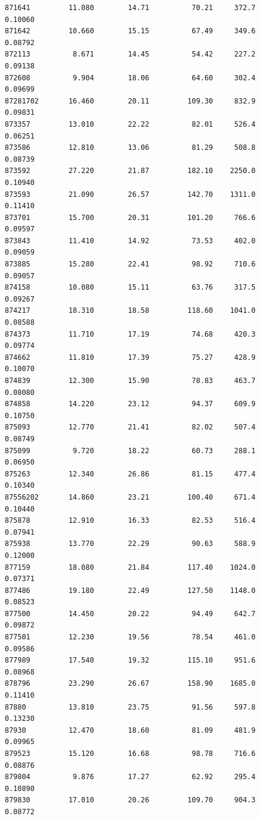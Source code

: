 \documentclass[
  letterpaper,
  DIV=11,
  numbers=noendperiod]{scrartcl}
\begin{document}
\begin{verbatim}
871641         11.080        14.71          70.21     372.7         0.10060
871642         10.660        15.15          67.49     349.6         0.08792
872113          8.671        14.45          54.42     227.2         0.09138
872608          9.904        18.06          64.60     302.4         0.09699
87281702       16.460        20.11         109.30     832.9         0.09831
873357         13.010        22.22          82.01     526.4         0.06251
873586         12.810        13.06          81.29     508.8         0.08739
873592         27.220        21.87         182.10    2250.0         0.10940
873593         21.090        26.57         142.70    1311.0         0.11410
873701         15.700        20.31         101.20     766.6         0.09597
873843         11.410        14.92          73.53     402.0         0.09059
873885         15.280        22.41          98.92     710.6         0.09057
874158         10.080        15.11          63.76     317.5         0.09267
874217         18.310        18.58         118.60    1041.0         0.08588
874373         11.710        17.19          74.68     420.3         0.09774
874662         11.810        17.39          75.27     428.9         0.10070
874839         12.300        15.90          78.83     463.7         0.08080
874858         14.220        23.12          94.37     609.9         0.10750
875093         12.770        21.41          82.02     507.4         0.08749
875099          9.720        18.22          60.73     288.1         0.06950
875263         12.340        26.86          81.15     477.4         0.10340
87556202       14.860        23.21         100.40     671.4         0.10440
875878         12.910        16.33          82.53     516.4         0.07941
875938         13.770        22.29          90.63     588.9         0.12000
877159         18.080        21.84         117.40    1024.0         0.07371
877486         19.180        22.49         127.50    1148.0         0.08523
877500         14.450        20.22          94.49     642.7         0.09872
877501         12.230        19.56          78.54     461.0         0.09586
877989         17.540        19.32         115.10     951.6         0.08968
878796         23.290        26.67         158.90    1685.0         0.11410
87880          13.810        23.75          91.56     597.8         0.13230
87930          12.470        18.60          81.09     481.9         0.09965
879523         15.120        16.68          98.78     716.6         0.08876
879804          9.876        17.27          62.92     295.4         0.10890
879830         17.010        20.26         109.70     904.3         0.08772

\end{verbatim}
\end{document}
